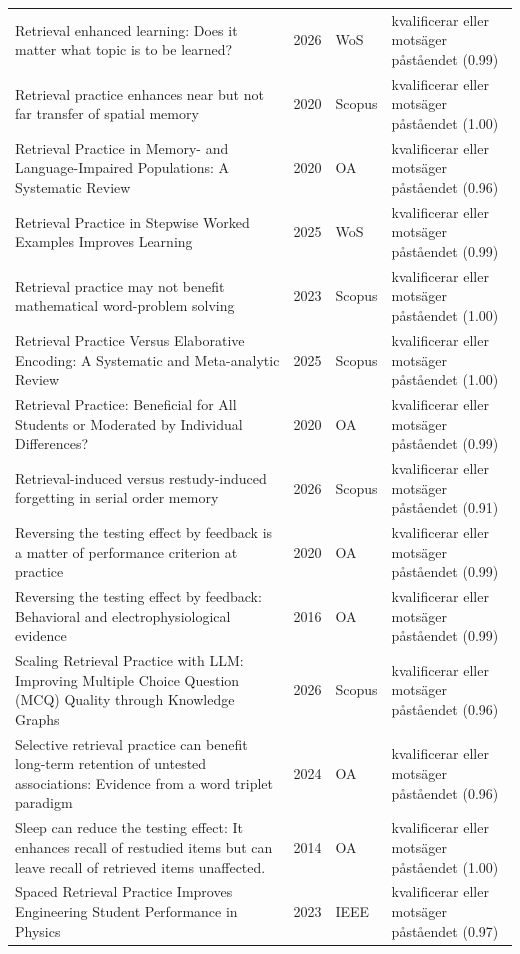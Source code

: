 \begin{longtable}{@{}%
  >{\raggedright\arraybackslash}p{}c%
  >{\raggedright\arraybackslash}p{}%
  >{\raggedright\arraybackslash}p{}@{}}
Retrieval enhanced learning: Does it matter what topic is to be learned? & 2026 & WoS & kvalificerar eller motsäger påståendet (0.99) \\
Retrieval practice enhances near but not far transfer of spatial memory & 2020 & Scopus & kvalificerar eller motsäger påståendet (1.00) \\
Retrieval Practice in Memory- and Language-Impaired Populations: A Systematic Review & 2020 & OA & kvalificerar eller motsäger påståendet (0.96) \\
Retrieval Practice in Stepwise Worked Examples Improves Learning & 2025 & WoS & kvalificerar eller motsäger påståendet (0.99) \\
Retrieval practice may not benefit mathematical word-problem solving & 2023 & Scopus & kvalificerar eller motsäger påståendet (1.00) \\
Retrieval Practice Versus Elaborative Encoding: A Systematic and Meta-analytic Review & 2025 & Scopus & kvalificerar eller motsäger påståendet (1.00) \\
Retrieval Practice: Beneficial for All Students or Moderated by Individual Differences? & 2020 & OA & kvalificerar eller motsäger påståendet (0.99) \\
Retrieval-induced versus restudy-induced forgetting in serial order memory & 2026 & Scopus & kvalificerar eller motsäger påståendet (0.91) \\
Reversing the testing effect by feedback is a matter of performance criterion at practice & 2020 & OA & kvalificerar eller motsäger påståendet (0.99) \\
Reversing the testing effect by feedback: Behavioral and electrophysiological evidence & 2016 & OA & kvalificerar eller motsäger påståendet (0.99) \\
Scaling Retrieval Practice with LLM: Improving Multiple Choice Question (MCQ) Quality through Knowledge Graphs & 2026 & Scopus & kvalificerar eller motsäger påståendet (0.96) \\
Selective retrieval practice can benefit long-term retention of untested associations: Evidence from a word triplet paradigm & 2024 & OA & kvalificerar eller motsäger påståendet (0.96) \\
Sleep can reduce the testing effect: It enhances recall of restudied items but can leave recall of retrieved items unaffected. & 2014 & OA & kvalificerar eller motsäger påståendet (1.00) \\
Spaced Retrieval Practice Improves Engineering Student Performance in Physics & 2023 & IEEE & kvalificerar eller motsäger påståendet (0.97) \\

\end{longtable}
